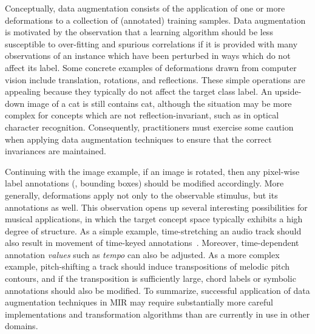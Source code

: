 \documentclass{article}
\begin{document}
Conceptually, data augmentation consists of the application of one or more deformations to
a collection of (annotated) training samples.
Data augmentation is motivated by the observation that a learning algorithm should be less
susceptible to over-fitting and spurious correlations if it is provided with many
observations of an instance which have been perturbed in ways which do not affect its
label.
Some concrete examples of deformations drawn from computer vision include translation,
rotations, and reflections.  These simple operations are appealing because they typically
do not affect the target class label. An upside-down image of a cat is still contains cat,
although the situation may be more complex for concepts which are not reflection-invariant,
such as in optical character recognition.  Consequently, practitioners must exercise some
caution when applying data augmentation techniques to ensure that the correct invariances
are maintained.

Continuing with the image example, if an image is rotated, then any pixel-wise
label annotations (\eg, bounding boxes) should be modified accordingly.
More generally, deformations apply not only to the observable stimulus,
but its annotations as well.
This observation opens up several interesting possibilities for musical applications, in
which the target concept space typically exhibits a high degree of structure.
As a simple example, time-stretching an audio track should also result in movement of
time-keyed annotations~\cite{mauch2013audio}.
Moreover, time-dependent annotation \emph{values} such as \emph{tempo} can also be adjusted.
As a more complex example,
pitch-shifting a track should induce transpositions of melodic pitch contours,
and if the transposition is sufficiently large, chord labels or symbolic annotations
should also be modified.
To summarize, successful application of data augmentation techniques in MIR may require
substantially more careful implementations and transformation algorithms than are currently
in use in other domains.

\end{document}
